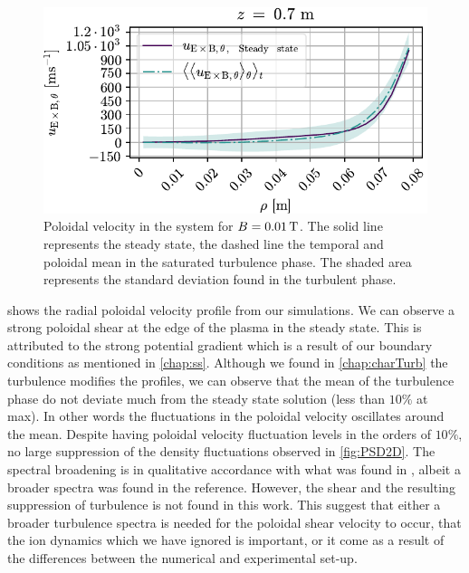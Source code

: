 %
\begin{figure}[htbp]
    \centering
    \includegraphics{fig/results/poloidalFlow/poloidalFlow01}
    \caption{Poloidal velocity in the system for $B=0.01\, \text{T}$.
        The solid line represents the steady state, the dashed line the temporal and poloidal mean in the saturated turbulence phase.
        The shaded area represents the standard deviation found in the turbulent phase.}
    \label{fig:poloidalFlow0008}
\end{figure}
%
 shows the radial poloidal velocity profile from our simulations.
We can observe a strong poloidal shear at the edge of the plasma in the steady state.
This is attributed to the strong potential gradient which is a result of our boundary conditions as mentioned in \cref{chap:ss}.
Although we found in \cref{chap:charTurb} the turbulence modifies the profiles, we can observe that the mean of the turbulence phase do not deviate much from the steady state solution (less than $10\%$ at max).
In other words the fluctuations in the poloidal velocity oscillates around the mean.
Despite having poloidal velocity fluctuation levels in the orders of $10\%$, no large suppression of the density fluctuations observed in \cref{fig:PSD2D}.
The spectral broadening is in qualitative accordance with what was found in \cite{Tynan2006a}, albeit a broader spectra was found in the reference.
However, the shear and the resulting suppression of turbulence is not found in this work.
This suggest that either a broader turbulence spectra is needed for the poloidal shear velocity to occur, that the ion dynamics which we have ignored is important, or it come as a result of the differences between the numerical and experimental set-up.
%
